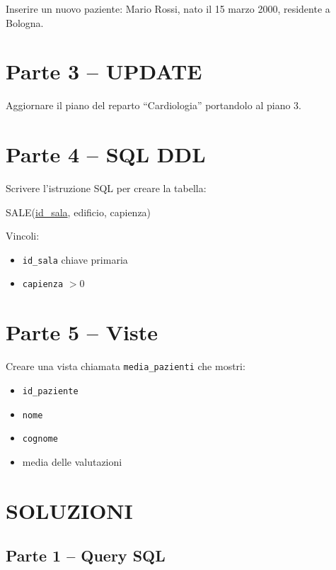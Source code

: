 \documentclass[a4paper,12pt]{article}
\begin{document}
	Inserire un nuovo paziente:
	Mario Rossi, nato il 15 marzo 2000, residente a Bologna.
	
	
	\section*{Parte 3 -- UPDATE}
	
	Aggiornare il piano del reparto ``Cardiologia'' portandolo al piano 3.
	

	\section*{Parte 4 -- SQL DDL}
	
	Scrivere l'istruzione SQL per creare la tabella:
	
	SALE(\underline{id\_sala}, edificio, capienza)
	
	Vincoli:
	\begin{itemize}
		\item \texttt{id\_sala} chiave primaria
		\item \texttt{capienza} $> 0$
	\end{itemize}
		
	\section*{Parte 5 -- Viste}
	
	Creare una vista chiamata \texttt{media\_pazienti} che mostri:
	\begin{itemize}
		\item \texttt{id\_paziente}
		\item \texttt{nome}
		\item \texttt{cognome}
		\item media delle valutazioni
	\end{itemize}
	
	
	\newpage
	\section*{SOLUZIONI}
	
	\subsection*{Parte 1 -- Query SQL}
	
\end{document}
